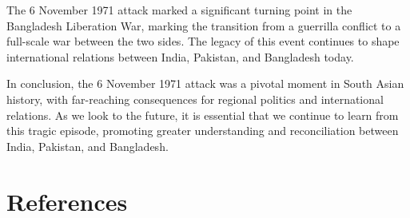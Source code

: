 The 6 November 1971 attack marked a significant turning point in the Bangladesh Liberation War, marking the transition from a guerrilla conflict to a full-scale war between the two sides. The legacy of this event continues to shape international relations between India, Pakistan, and Bangladesh today.

In conclusion, the 6 November 1971 attack was a pivotal moment in South Asian history, with far-reaching consequences for regional politics and international relations. As we look to the future, it is essential that we continue to learn from this tragic episode, promoting greater understanding and reconciliation between India, Pakistan, and Bangladesh.

\section{References}

